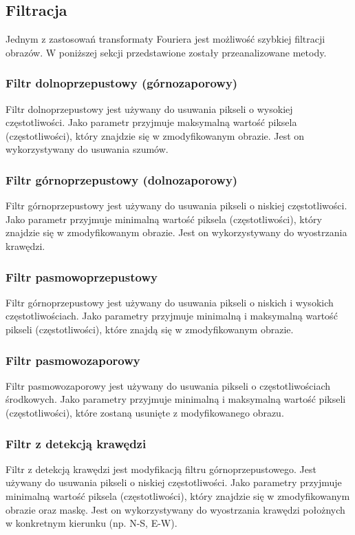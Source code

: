 \documentclass{classrep}
\begin{document}
\subsection{Filtracja}
Jednym z zastosowań transformaty Fouriera jest możliwość szybkiej filtracji obrazów. W poniższej sekcji przedstawione zostały przeanalizowane metody.

\subsubsection{Filtr dolnoprzepustowy (górnozaporowy)}
Filtr dolnoprzepustowy jest używany do usuwania pikseli o wysokiej częstotliwości. Jako parametr przyjmuje maksymalną wartość piksela (częstotliwości), który znajdzie się w zmodyfikowanym obrazie. Jest on wykorzystywany do usuwania szumów.

\subsubsection{Filtr górnoprzepustowy (dolnozaporowy)}
Filtr górnoprzepustowy jest używany do usuwania pikseli o niskiej częstotliwości. Jako parametr przyjmuje minimalną wartość piksela (częstotliwości), który znajdzie się w zmodyfikowanym obrazie. Jest on wykorzystywany do wyostrzania krawędzi.

\subsubsection{Filtr pasmowoprzepustowy}
Filtr górnoprzepustowy jest używany do usuwania pikseli o niskich i wysokich częstotliwościach. Jako parametry przyjmuje minimalną i maksymalną wartość pikseli (częstotliwości), które znajdą się w zmodyfikowanym obrazie.

\subsubsection{Filtr pasmowozaporowy}
Filtr pasmowozaporowy jest używany do usuwania pikseli o częstotliwościach środkowych. Jako parametry przyjmuje minimalną i maksymalną wartość pikseli (częstotliwości), które zostaną usunięte z modyfikowanego obrazu.

\subsubsection{Filtr z detekcją krawędzi}
Filtr z detekcją krawędzi jest modyfikacją filtru górnoprzepustowego. Jest używany do usuwania pikseli o niskiej częstotliwości. Jako parametry przyjmuje minimalną wartość piksela (częstotliwości), który znajdzie się w zmodyfikowanym obrazie oraz maskę. Jest on wykorzystywany do wyostrzania krawędzi położnych w konkretnym kierunku (np. N-S, E-W).
\end{document}
